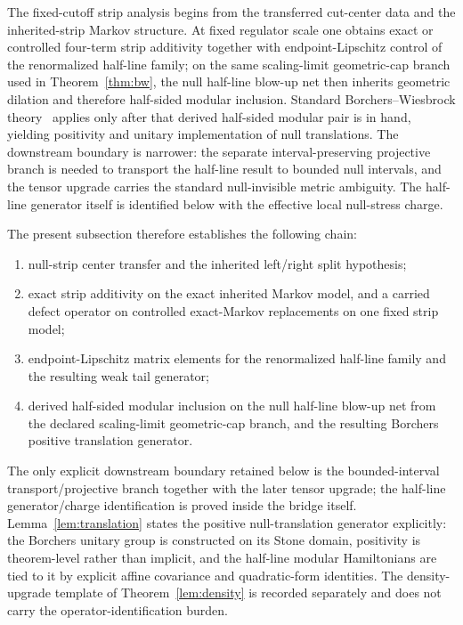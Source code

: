 \documentclass[11pt]{article}
\begin{document}
The fixed-cutoff strip analysis begins from the transferred cut-center data and the inherited-strip Markov structure. At fixed regulator scale one obtains exact or controlled four-term strip additivity together with endpoint-Lipschitz control of the renormalized half-line family; on the same scaling-limit geometric-cap branch used in Theorem~\ref{thm:bw}, the null half-line blow-up net then inherits geometric dilation and therefore half-sided modular inclusion. Standard Borchers--Wiesbrock theory~\cite{wiesbrock93} applies only after that derived half-sided modular pair is in hand, yielding positivity and unitary implementation of null translations. The downstream boundary is narrower: the separate interval-preserving projective branch is needed to transport the half-line result to bounded null intervals, and the tensor upgrade carries the standard null-invisible metric ambiguity. The half-line generator itself is identified below with the effective local null-stress charge.
\par
The present subsection therefore establishes the following chain:
\begin{enumerate}[leftmargin=2em]
\item null-strip center transfer and the inherited left/right split hypothesis;
\item exact strip additivity on the exact inherited Markov model, and a carried defect operator on controlled exact-Markov replacements on one fixed strip model;
\item endpoint-Lipschitz matrix elements for the renormalized half-line family and the resulting weak tail generator;
\item derived half-sided modular inclusion on the null half-line blow-up net from the declared scaling-limit geometric-cap branch, and the resulting Borchers positive translation generator.
\end{enumerate}
The only explicit downstream boundary retained below is the bounded-interval transport/projective branch together with the later tensor upgrade; the half-line generator/charge identification is proved inside the bridge itself. Lemma~\ref{lem:translation} states the positive null-translation generator explicitly: the Borchers unitary group is constructed on its Stone domain, positivity is theorem-level rather than implicit, and the half-line modular Hamiltonians are tied to it by explicit affine covariance and quadratic-form identities. The density-upgrade template of Theorem~\ref{lem:density} is recorded separately and does not carry the operator-identification burden.
\end{document}
